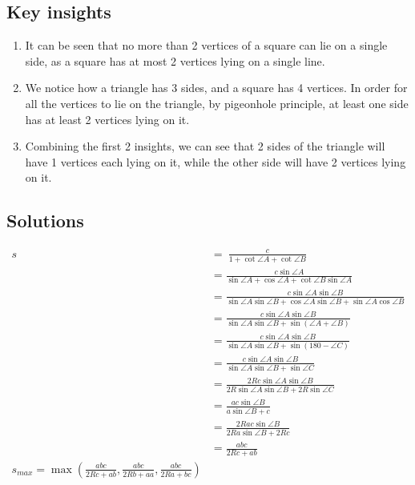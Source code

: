 \documentclass[12pt]{scrartcl}
\begin{document}
\subsection{Key insights}
\begin{enumerate}
	\item It can be seen that no more than 2 vertices of a square can lie on a single side, as a square has at most 2 vertices lying on a single line.
	\item We notice how a triangle has 3 sides, and a square has 4 vertices. In order for all the vertices to lie on the triangle, by pigeonhole principle, at least one side has at least 2 vertices lying on it.
	\item Combining the first 2 insights, we can see that 2 sides of the triangle will have 1 vertices each lying on it, while the other side will have 2 vertices lying on it.
\end{enumerate}

\subsection{Solutions}
\begin{align*}
s\ &=\ \frac{c}{1+\cot \angle A+\cot \angle B} \\
&=\frac{c\sin \angle A}{\sin \angle A+\cos \angle A+\cot \angle B\sin \angle A} \\
&=\frac{c\sin \angle A\sin \angle B}{\sin \angle A\sin \angle B+\cos \angle A\sin \angle B+\sin \angle A\cos \angle B} \\
&=\frac{c\sin \angle A\sin \angle B}{\sin \angle A\sin \angle B+\sin\left(\angle A+\angle B\right)} \\
&=\frac{c\sin \angle A\sin \angle B}{\sin \angle A\sin \angle B+\sin\left(180-\angle C\right)} \\
&=\frac{c\sin \angle A\sin \angle B}{\sin \angle A\sin \angle B+\sin \angle C} \\
&=\frac{2Rc\sin \angle A\sin \angle B}{2R\sin \angle A\sin \angle B+2R\sin \angle C} \\
&=\frac{ac\sin \angle B}{a\sin \angle B+c} \\
&=\frac{2Rac\sin \angle B}{2Ra\sin \angle B+2Rc} \\
&=\frac{abc}{2Rc+ab} \\
s_{max}=\max\left(\frac{abc}{2Rc+ab},\frac{abc}{2Rb+aa},\frac{abc}{2Ra+bc}\right)
\end{align*}


\printbibliography
\end{document}

